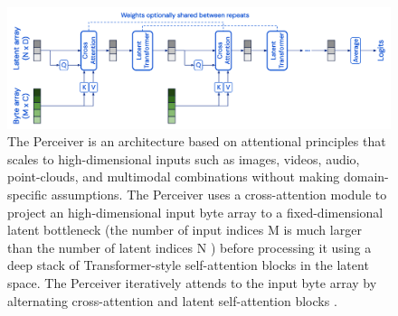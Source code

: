 \begin{figure}
    \centering
    \includegraphics[width=\textwidth]{figures/figure_background_perceiver_architecture.png}
    \caption{The Perceiver is an architecture based on attentional principles that scales to high-dimensional inputs such as images, videos, audio, point-clouds, and multimodal combinations without making domain-specific assumptions. The Perceiver uses a cross-attention module to project an high-dimensional input byte array to a fixed-dimensional latent bottleneck (the number of input indices M is much larger than the number of latent indices N ) before processing it using a deep stack of Transformer-style self-attention blocks in the latent space. The Perceiver iteratively attends to the input byte array by alternating cross-attention and latent self-attention blocks \cite{jaeglePerceiverGeneralPerception2021}.}
    \label{fig:figure_background_perceiver_architecture}
\end{figure}

